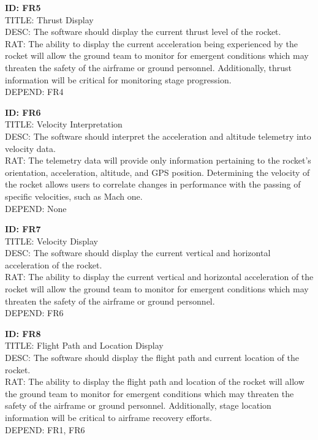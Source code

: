 \documentclass[onecolumn, draftclsnofoot,10pt, compsoc]{IEEEtran}
\begin{document}
			\noindent
			\textbf{ID: FR5}\\
			TITLE: Thrust Display\\
			DESC: The software should display the current thrust level of the rocket.\\
			RAT: The ability to display the current acceleration being experienced by the rocket will allow the ground team to monitor for emergent conditions which may threaten the safety of the airframe or ground personnel.
				Additionally, thrust information will be critical for monitoring stage progression.\\
			DEPEND: FR4
			
			\noindent
			\textbf{ID: FR6}\\
			TITLE: Velocity Interpretation\\
			DESC: The software should interpret the acceleration and altitude telemetry into velocity data.\\
			RAT: The telemetry data will provide only information pertaining to the rocket's orientation, acceleration, altitude, and GPS position.
				Determining the velocity of the rocket allows users to correlate changes in performance with the passing of specific velocities, such as Mach one.\\
			DEPEND: None
			
			\noindent
			\textbf{ID: FR7}\\
			TITLE: Velocity Display\\
			DESC: The software should display the current vertical and horizontal acceleration of the rocket.\\
			RAT: The ability to display the current vertical and horizontal acceleration of the rocket will allow the ground team to monitor for emergent conditions which may threaten the safety of the airframe or ground personnel.\\
			DEPEND: FR6
			
			\noindent
			\textbf{ID: FR8}\\
			TITLE: Flight Path and Location Display\\
			DESC: The software should display the flight path and current location of the rocket.\\
			RAT: The ability to display the flight path and location of the rocket will allow the ground team to monitor for emergent conditions which may threaten the safety of the airframe or ground personnel.
				Additionally, stage location information will be critical to airframe recovery efforts.\\
			DEPEND: FR1, FR6
			
\end{document}
